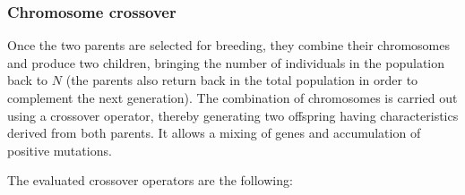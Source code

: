 \documentclass[twocol]{ametsoc}
\begin{document}
\subsubsection{Chromosome crossover}

Once the two parents are selected for breeding, they combine their chromosomes and produce two children, bringing the number of individuals in the population back to $N$ (the parents also return back in the total population in order to complement the next generation). The combination of chromosomes is carried out using a crossover operator, thereby generating two offspring having characteristics derived from both parents. It allows a mixing of genes and accumulation of positive mutations.

The evaluated crossover operators are the following:
\end{document}
